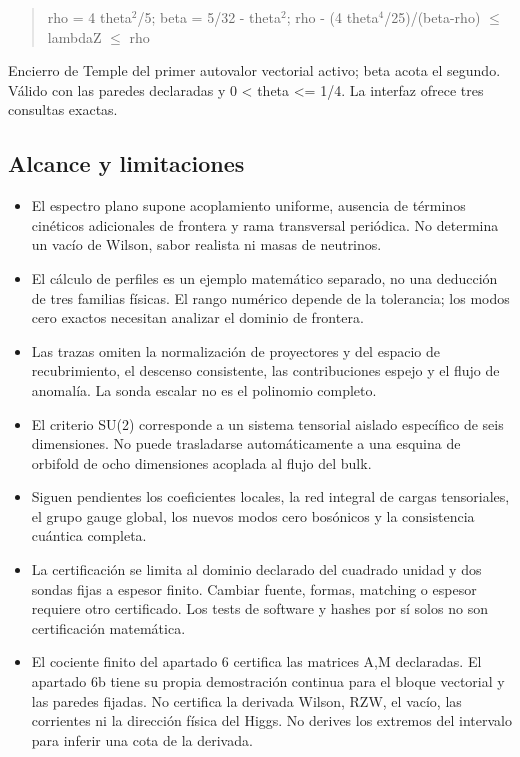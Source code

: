 \documentclass[11pt,a4paper]{article}
\begin{document}
\begin{quote}rho = 4 theta\ensuremath{{}^{2}}/5; beta = 5/32 - theta\ensuremath{{}^{2}}; rho - (4 theta\ensuremath{{}^{4}}/25)/(beta-rho) \ensuremath{\leq} lambdaZ \ensuremath{\leq} rho\end{quote}
Encierro de Temple del primer autovalor vectorial activo; beta acota el segundo. Válido con las paredes declaradas y 0 < theta <= 1/4. La interfaz ofrece tres consultas exactas.

\subsection*{Alcance y limitaciones}
\begin{itemize}
\item El espectro plano supone acoplamiento uniforme, ausencia de términos cinéticos adicionales de frontera y rama transversal periódica. No determina un vacío de Wilson, sabor realista ni masas de neutrinos.
\item El cálculo de perfiles es un ejemplo matemático separado, no una deducción de tres familias físicas. El rango numérico depende de la tolerancia; los modos cero exactos necesitan analizar el dominio de frontera.
\item Las trazas omiten la normalización de proyectores y del espacio de recubrimiento, el descenso consistente, las contribuciones espejo y el flujo de anomalía. La sonda escalar no es el polinomio completo.
\item El criterio SU(2) corresponde a un sistema tensorial aislado específico de seis dimensiones. No puede trasladarse automáticamente a una esquina de orbifold de ocho dimensiones acoplada al flujo del bulk.
\item Siguen pendientes los coeficientes locales, la red integral de cargas tensoriales, el grupo gauge global, los nuevos modos cero bosónicos y la consistencia cuántica completa.
\item La certificación se limita al dominio declarado del cuadrado unidad y dos sondas fijas a espesor finito. Cambiar fuente, formas, matching o espesor requiere otro certificado. Los tests de software y hashes por sí solos no son certificación matemática.
\item El cociente finito del apartado 6 certifica las matrices A,M declaradas. El apartado 6b tiene su propia demostración continua para el bloque vectorial y las paredes fijadas. No certifica la derivada Wilson, RZW, el vacío, las corrientes ni la dirección física del Higgs. No derives los extremos del intervalo para inferir una cota de la derivada.
\end{itemize}
\end{document}
